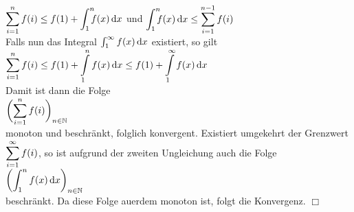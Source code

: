\hspace*{1.3cm}
$\ds \sum\limits_{i=1}^n f(i) \leq f(1) + \dint{1}{n} f(x)\, \dr x$
\quad und \quad
$\dint{1}{n} f(x)\, \dr x \leq \sum\limits_{i=1}^{n-1} f(i)$
\\[0.2cm]
Falls nun das Integral $\int_{1}^\infty f(x)\, \textrm{d} x$ existiert, so gilt
\\[0.2cm]
\hspace*{1.3cm}
$\displaystyle \sum\limits_{i=1}^{n} f(i) \leq f(1) + \int\limits_{1}^n f(x)\, \textrm{d} x \leq f(1) + \int\limits_{1}^\infty f(x)\, \textrm{d} x$
\\[0.2cm]
Damit ist dann die Folge 
\\
\hspace*{1.3cm}
$\displaystyle \biggl(\sum\limits_{i=1}^{n}  f(i)\biggr)_{n\in\mathbb{N}}$ 
\\ 
monoton und beschr\"ankt, folglich konvergent.  Existiert umgekehrt der Grenzwert
$\displaystyle \sum\limits_{i=1}^{\infty} f(i)$, so  ist aufgrund der zweiten Ungleichung auch die Folge
\\[0.3cm]
\hspace*{1.3cm}
$\displaystyle \biggl(\int_{1}^n f(x)\, \textrm{d} x\biggr)_{n\in\mathbb{N}}$
\\[0.3cm]
beschr\"ankt.  Da diese Folge au\3erdem monoton ist, folgt die Konvergenz. \hspace*{\fill} $\Box$
\vspace*{0.3cm}

